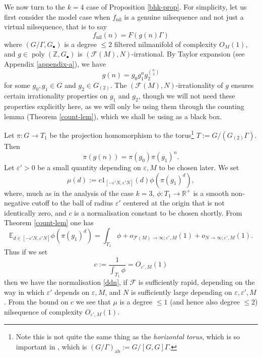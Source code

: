 \documentclass[11pt,reqno]{amsart}
\numberwithin{equation}{section}
\theoremstyle{plain}
\theoremstyle{definition}
\renewcommand{\leq}{\leqslant}
\newcommand\E{{\mathbb{E}}}
\newcommand\Z{\mathbb{Z}}
\newcommand\R{\mathbb{R}}
\newcommand\ab{\operatorname{ab}}
\newcommand\1{{\bf 1}}
\newcommand\2{{\bf 2}}
\newcommand\eps{\varepsilon}
\newcommand\poly{\operatorname{poly}}
\newcommand\nil{{\operatorname{nil}}}
\newcommand\Grow{{\mathcal F}}
\begin{document}
We now turn to the $k=4$ case of Proposition \ref{bhk-prop}.  For simplicity, let us first consider the model case when $f_\nil$ is a genuine nilsequence and not just a virtual nilsequence, that is to say
\begin{equation}\label{fnil-form}
f_\nil(n) = F(g(n) \Gamma)
\end{equation}
where $(G/\Gamma,G_\bullet)$ is a degree $\leq 2$ filtered nilmanifold of complexity $O_M(1)$, and $g \in \poly(\Z,G_\bullet)$ is $(\Grow(M),N)$-irrational.  By Taylor expansion (see Appendix \ref{appendix-a}), we have
$$ g(n) = g_0 g_1^n g_2^{\binom{n}{2}}$$
for some $g_0, g_1 \in G$ and $g_2 \in G_{(2)}$.  The $(\Grow(M),N)$-irrationality of $g$ ensures certain irrationality properties on $g_1$ and $g_2$, though we will not need these properties explicitly here, as we will only be using them through the counting lemma (Theorem \ref{count-lem}), which we shall be using as a black box.

Let $\pi: G \to T_1$ be the projection homomorphism to the torus\footnote{Note this is not quite the same thing as the \emph{horizontal torus}, which is so important in \cite{green-tao-nilratner}, which is $(G/\Gamma)_{\ab} := G/[G,G]\Gamma$.} $T:= G/(G_{(2)} \Gamma)$. Then
$$ \pi(g(n)) = \pi(g_0) \pi(g_1)^n.$$
Let $\eps' > 0$ be a small quantity depending on $\eps, M$ to be chosen later.  We set 
$$ \mu(d) := c 1_{[-\eps'N,\eps'N]}(d) \phi(\pi(g_1)^d),$$
where, much as in the analysis of the case $k = 3$, $\phi: T_1 \to \R^+$ is a smooth non-negative cutoff to the ball of radius $\eps'$ centered at the origin that is not identically zero, and $c$ is a normalisation constant to be chosen shortly.  From Theorem \ref{count-lem} one has
$$ \E_{d \in [-\eps'N,\eps'N]} \phi(\pi(g_1)^d) = \int_{T_1} \phi + o_{\Grow(M) \to \infty; \eps',M}(1)
+ o_{N \to \infty; \eps',M}(1).$$
Thus if we set
\begin{equation}\label{ctp}
 c := \frac{1}{\int_{T_1} \phi} = O_{\eps',M}(1)
 \end{equation}
then we have the normalisation \eqref{ddn}, if $\Grow$ is sufficiently rapid, depending on the way in which $\eps'$ depends on $\eps,M$, and $N$ is sufficiently large depending on $\eps,\eps',M$.
From the bound on $c$ we see that $\mu$ is a degree $\leq 1$ (and hence also degree $\leq 2$) nilsequence of complexity $O_{\eps',M}(1)$.
\end{document}
